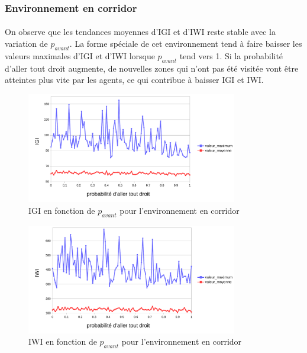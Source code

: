 \documentclass{article}
\begin{document}
    \subsubsection{Environnement en corridor}
    \paragraph{}On observe que les tendances moyennes d'IGI et d'IWI reste stable avec la variation de $p_{avant}$. La forme spéciale de cet environnement tend à faire baisser les valeurs maximales d'IGI et d'IWI lorsque $p_{avant}$ tend  vers 1.
    Si la probabilité d'aller tout droit augmente, de nouvelles zones qui n'ont pas été visitée vont être atteintes plus vite par les agents, ce qui contribue à baisser IGI et IWI.
    \begin{figure}[!h]
        \begin{center}
            \includegraphics[width = 0.82\textwidth]{graphes pdf/variance go-ahead IGI corridor.pdf}
            \caption{IGI en fonction de $p_{avant}$ pour l'environnement en corridor}
        \end{center}
    \end{figure}
    \begin{figure}[!h]
        \begin{center}
            \includegraphics[width = 0.82\textwidth]{graphes pdf/variance go-ahead IWI corridor.pdf}
            \caption{IWI en fonction de $p_{avant}$ pour l'environnement en corridor}
        \end{center}
    \end{figure}
\end{document}
